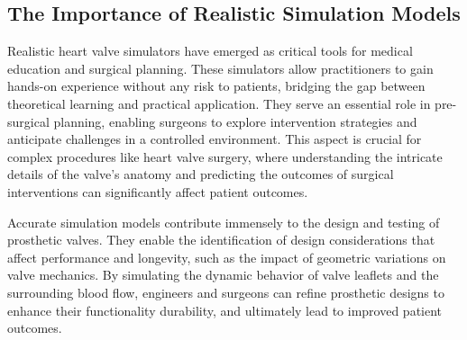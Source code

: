 \subsection{The Importance of Realistic Simulation Models}
Realistic heart valve simulators have emerged as critical tools for medical education and surgical planning. These simulators allow practitioners to gain hands-on experience without any risk to patients, bridging the gap between theoretical learning and practical application. They serve an essential role in pre-surgical planning, enabling surgeons to explore intervention strategies and anticipate challenges in a controlled environment. This aspect is crucial for complex procedures like heart valve surgery, where understanding the intricate details of the valve's anatomy and predicting the outcomes of surgical interventions can significantly affect patient outcomes.


Accurate simulation models contribute immensely to the design and testing of prosthetic valves. They enable the identification of design considerations that affect performance and longevity, such as the impact of geometric variations on valve mechanics. By simulating the dynamic behavior of valve leaflets and the surrounding blood flow, engineers and surgeons can refine prosthetic designs to enhance their functionality durability, and ultimately lead to improved patient outcomes.



